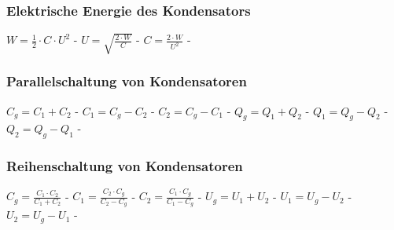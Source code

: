 \subsubsection{Elektrische Energie des Kondensators} 
\begin{minipage}{0.45\textwidth} 
\end{minipage} 
\begin{minipage}{0.45\textwidth} 
 
\legende{}\end{minipage} 
 
$ W =\frac{1}{2}\cdot C\cdot U^{2} $ - $ U = \sqrt{\frac{2\cdot W}{ C}} $ - $ C = \frac{2\cdot W}{ U^{2} } $ - \\ 
 
\subsubsection{Parallelschaltung von Kondensatoren} 
\begin{minipage}{0.45\textwidth} 
\end{minipage} 
\begin{minipage}{0.45\textwidth} 
 
\legende{}\end{minipage} 
 
$ C_{g}  = C_{1}  + C_{2} $ - $ C_{1}  = C_{g}  - C_{2} $ - $ C_{2}  = C_{g}  - C_{1} $ - $ Q_{g}  = Q_{1}  + Q_{2} $ - $ Q_{1}  = Q_{g}  - Q_{2} $ - $ Q_{2}  = Q_{g}  - Q_{1} $ - \\ 
 
\subsubsection{Reihenschaltung von Kondensatoren} 
\begin{minipage}{0.45\textwidth} 
\end{minipage} 
\begin{minipage}{0.45\textwidth} 
 
\legende{}\end{minipage} 
 
$ C_{g}  = \frac{C_{1} \cdot C_{2} }{C_{1} +C_{2} } $ - $ C_{1}  = \frac{C_{2} \cdot C_{g} }{C_{2} -C_{g} } $ - $ C_{2}  = \frac{C_{1} \cdot C_{g} }{C_{1} -C_{g} } $ - $ U_{g}  = U_{1}  + U_{2} $ - $ U_{1}  = U_{g}  - U_{2} $ - $ U_{2}  = U_{g}  - U_{1} $ - \\ 
 
